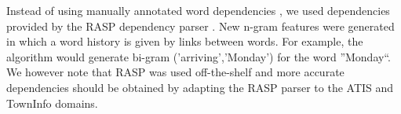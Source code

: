 \documentclass{article}
\begin{document}
Instead of using manually annotated word dependencies \cite{kate08}, we used dependencies provided by the RASP dependency parser \cite{rasp06}. 
New n-gram features were generated in which a word history is given by links between words. For example, the algorithm would generate bi-gram ('arriving','Monday') for the word ''Monday``.
We however note that RASP was used off-the-shelf and more accurate dependencies should be obtained by adapting the RASP parser to the ATIS and TownInfo domains.

\end{document}
